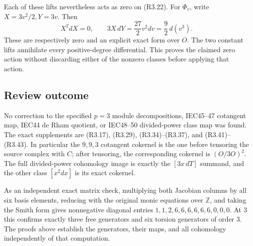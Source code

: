 \documentclass[
  10pt,
]{article}
\begin{document}
Each of these lifts nevertheless acts as zero on (R3.22). For
\(\Phi_v\), write \(X=3v^2/2,Y=3v\). Then \[
X^2dX=0,\qquad
3X\,dY=\frac{27}{2}v^2dv=\frac92\,d(v^3).
\] These are respectively zero and an explicit exact form over \(O\).
The two constant lifts annihilate every positive-degree differential.
This proves the claimed zero action without discarding either of the
nonzero classes before applying that action.

\subsection{Review outcome}\label{review-outcome}

No correction to the specified \(p=3\) module decompositions, IEC45--47
cotangent map, IEC44 de Rham quotient, or IEC48--50 divided-power class
map was found. The exact supplements are (R3.17), (R3.29),
(R3.34)--(R3.37), and (R3.41)--(R3.43). In particular the \(9,9,3\)
cotangent cokernel is the one before tensoring the source complex with
\(C\); after tensoring, the corresponding cokernel is \((O/3O)^2\). The
full divided-power cohomology image is exactly the \([3x\,dT]\) summand,
and the other class \([x^2dx]\) is its exact cokernel.

As an independent exact matrix check, multiplying both Jacobian columns
by all six basis elements, reducing with the original monic equations
over \(\mathbb Z\), and taking the Smith form gives nonnegative diagonal
entries \(1,1,2,6,6,6,6,6,6,0,0,0\). At 3 this confirms exactly three
free generators and six torsion generators of order 3. The proofs above
establish the generators, their maps, and all cohomology independently
of that computation.
\end{document}
